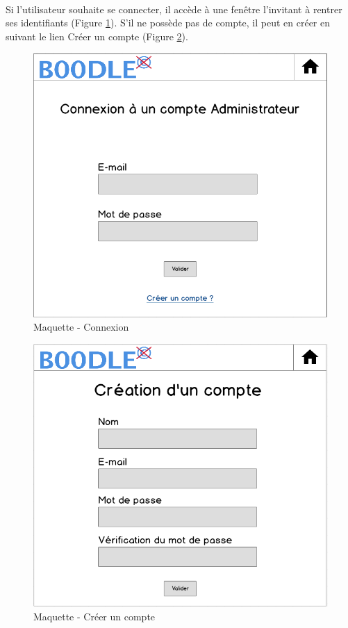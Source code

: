 \documentclass[titlepage]{report}
\begin{document}
\paragraph{} Si l'utilisateur souhaite se connecter, il accède à une fenêtre l'invitant à rentrer ses identifiants (Figure \ref{maquette_connexion}). 
S'il ne possède pas de compte, il peut en créer en suivant le lien Créer un compte (Figure \ref{maquette_creationCompte}).

\begin{figure}[h]
	\caption{Maquette - Connexion}
	\label{maquette_connexion}
	\centering
	\includegraphics[scale=0.7]{figures/maquettes/connexion.png}
\end{figure}

\begin{figure}[h]
	\caption{Maquette - Créer un compte}
	\label{maquette_creationCompte}
	\centering
	\includegraphics[scale=0.7]{figures/maquettes/creationCompte.png}
\end{figure}
\end{document}
